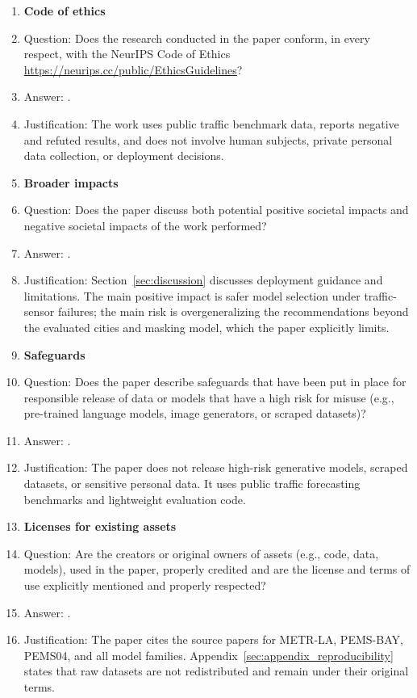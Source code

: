 \begin{enumerate}
\item {\bf Code of ethics}
    \item[] Question: Does the research conducted in the paper conform, in every respect, with the NeurIPS Code of Ethics \url{https://neurips.cc/public/EthicsGuidelines}?
    \item[] Answer: \answerYes{}.
    \item[] Justification: The work uses public traffic benchmark data, reports negative and refuted results, and does not involve human subjects, private personal data collection, or deployment decisions.

\item {\bf Broader impacts}
    \item[] Question: Does the paper discuss both potential positive societal impacts and negative societal impacts of the work performed?
    \item[] Answer: \answerYes{}.
    \item[] Justification: Section~\ref{sec:discussion} discusses deployment guidance and limitations. The main positive impact is safer model selection under traffic-sensor failures; the main risk is overgeneralizing the recommendations beyond the evaluated cities and masking model, which the paper explicitly limits.

\item {\bf Safeguards}
    \item[] Question: Does the paper describe safeguards that have been put in place for responsible release of data or models that have a high risk for misuse (e.g., pre-trained language models, image generators, or scraped datasets)?
    \item[] Answer: \answerNA{}.
    \item[] Justification: The paper does not release high-risk generative models, scraped datasets, or sensitive personal data. It uses public traffic forecasting benchmarks and lightweight evaluation code.

\item {\bf Licenses for existing assets}
    \item[] Question: Are the creators or original owners of assets (e.g., code, data, models), used in the paper, properly credited and are the license and terms of use explicitly mentioned and properly respected?
    \item[] Answer: \answerYes{}.
    \item[] Justification: The paper cites the source papers for METR-LA, PEMS-BAY, PEMS04, and all model families. Appendix~\ref{sec:appendix_reproducibility} states that raw datasets are not redistributed and remain under their original terms.


\end{enumerate}
